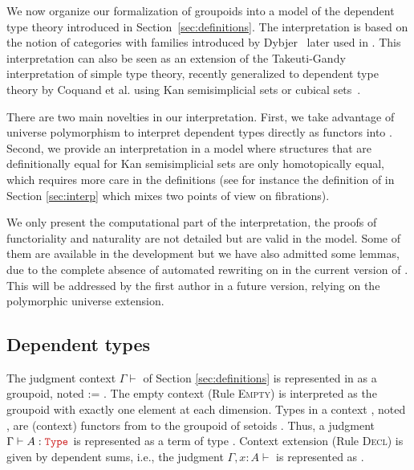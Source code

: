 
\begin{coqdoccode}
\end{coqdoccode}


  We now organize our formalization of groupoids into a model of the dependent 
  type theory introduced in Section~\ref{sec:definitions}.
  The interpretation is based on the notion of categories with families 
  introduced by Dybjer~\cite{dybjer:internaltt} later used in \cite{groupoid-interp}.
  This interpretation can also be seen as an extension of the Takeuti-Gandy interpretation of simple type theory, recently generalized to dependent type theory by Coquand et al. using Kan semisimplicial sets or cubical sets~\cite{barras:_gener_takeut_gandy_inter}. 


  There are two main novelties in our interpretation. First, we
  take advantage of universe polymorphism to interpret dependent types
  directly as functors into . Second, we provide an
  interpretation in a model where structures that are definitionally
  equal for Kan semisimplicial sets are only homotopically equal, which
  requires more care in the definitions (see for instance the definition
  of  in Section \ref{sec:interp} which mixes two points of view
  on fibrations).


  We only present the computational part of the interpretation, the
  proofs of functoriality and naturality are not detailed but are valid
  in the model. Some of them are available in the \Coq development but
  we have also admitted some lemmas, due to the complete absence of
  automated rewriting on  in the current version of \Coq. This
  will be addressed by the first author in a future version, relying on
  the polymorphic universe extension.


\subsection{Dependent types}




  The judgment context $\Gamma \vdash$ of Section
  \ref{sec:definitions} is represented in \Coq as a groupoid, noted
   := . The empty context (Rule \textsc{Empty})
  is interpreted as the groupoid with exactly one element at each
  dimension.  Types in a context , noted  , are (context)
  functors from  to the groupoid of setoids .  Thus, a
  judgment $\Gamma \vdash A : \Type{}$ is represented as a term  of
  type  . Context extension (Rule \textsc{Decl}) is given by
  dependent sums, i.e., the judgment $\Gamma, x:A \vdash$ is represented
  as \coqdocvar{$\Sigma$} .


